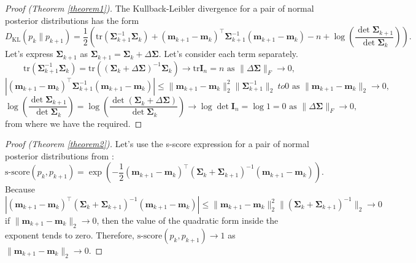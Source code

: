 \documentclass[
11pt,%
tightenlines,%
twoside,%
onecolumn,%
nofloats,%
nobibnotes,%
nofootinbib,%
superscriptaddress,%
noshowpacs,%
centertags]%
{revtex4-2}
\begin{document}
\begin{proof}[Proof (Theorem \ref{theorem1})]
The Kullback-Leibler divergence for a pair of normal posterior distributions has the form
    \[ D_{\text{KL}}\left( p_k \| p_{k+1} \right) = \dfrac{1}{2} \left( \mathrm{tr}\left( \mathbf{\Sigma}_{k+1}^{-1} \mathbf{\Sigma}_k \right) + (\mathbf{m}_{k+1} - \mathbf{m}_k)^{\top} \mathbf{\Sigma}_{k+1}^{-1} (\mathbf{m}_{k+1} - \mathbf{m}_k) - n + \log{\left( \dfrac{\det \mathbf{\Sigma}_{k+1}}{\det \mathbf{\Sigma}_{k}} \right)} \right). \]
    Let's express $\mathbf{\Sigma}_{k+1}$ as $\mathbf{\Sigma}_{k+1} = \mathbf{\Sigma}_k + \Delta\mathbf{\Sigma}$. Let's consider each term separately.
    \[ \mathrm{tr}\left( \mathbf{\Sigma}_{k+1}^{-1} \mathbf{\Sigma}_k \right) = \mathrm{tr}\left(\left(\mathbf{\Sigma}_k + \Delta \mathbf{\Sigma} \right)^{-1} \mathbf{\Sigma}_k \right) \to \mathrm{tr}\mathbf{I}_n=n\text{ as } \| \Delta \mathbf{\Sigma} \|_F \to 0, \]
    \[ \left| (\mathbf{m}_{k+1} - \mathbf{m}_k)^{\top}\mathbf{\Sigma}_{k+1}^{-1} (\mathbf{m}_{k+1} - \mathbf{m}_k) \right| \leqslant\| \mathbf{m}_{k+1} -\mathbf{m}_k\|_2^2\|\mathbf{\Sigma}_{k+1}^{-1} \|_2 \ to 0 \text{ as } \| \mathbf{m}_{k+1} - \mathbf{m}_k\|_2 \to 0, \]
    \[ \log{\left( \dfrac{\det \mathbf{\Sigma}_{k+1}}{\det \mathbf{\Sigma}_{k}} \right)} = \log{\left( \dfrac{\det \left( \mathbf{\Sigma}_k + \Delta \mathbf{\Sigma} \right)}{\det\mathbf{\Sigma}_{k}} \right)} \to \log \det\mathbf{I}_n = \log 1 = 0 \text{ as } \| \Delta \mathbf{\Sigma} \|_F\to 0, \]
    from where we have the required.
\end{proof}

\begin{proof}[Proof (Theorem \ref{theorem2})]
Let's use the s-score expression for a pair of normal posterior distributions from \cite{Aduenko2017}:
\[\text{s-score}(p_k, p_{k+1}) = \exp{\left( -\dfrac{1}{2} (\mathbf{m}_{k+1} - \mathbf{m}_k)^{\top} \left( \mathbf{\Sigma}_k + \mathbf{\Sigma}_{k+1} \right)^{-1} (\mathbf{m}_{k+1} - \mathbf{m}_k) \right)}. \]
Because
    \[ \left| (\mathbf{m}_{k+1} - \mathbf{m}_k)^{\top} \left( \mathbf{\Sigma}_k + \mathbf{\Sigma}_{k+1} \right)^{-1} (\mathbf{m}_{k+1} - \mathbf{m}_k) \right| \leqslant \| \mathbf{m}_{k+1} - \mathbf{m}_k \|_2^2 \| \left( \mathbf{\Sigma}_k + \mathbf{\Sigma}_{k+1} \right)^{-1} \|_2 \to 0 \]
    if $\|\mathbf{m}_{k+1} - \mathbf{m}_k\|_2\to 0$, then the value of the quadratic form inside the exponent tends to zero. Therefore, $\text{s-score}(p_k, p_{k+1}) \to 1$ as $\|\mathbf{m}_{k+1} - \mathbf{m}_k\|_2\to 0$.
\end{proof}
\end{document}
